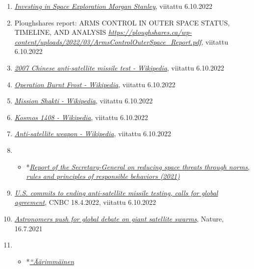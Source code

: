 \begin{enumerate}
\item
  \href{https://www.morganstanley.com/ideas/investing-in-space}{\emph{Investing
  in Space Exploration \textbar{} Morgan Stanley}}, viitattu 6.10.2022
\item
  Ploughshares report: ARMS CONTROL IN OUTER SPACE STATUS, TIMELINE, AND
  ANALYSIS\emph{
  }\href{https://ploughshares.ca/wp-content/uploads/2022/03/ArmsControlOuterSpace_Report.pdf}{\emph{https://ploughshares.ca/wp-content/uploads/2022/03/ArmsControlOuterSpace\_Report.pdf}},
  viitattu 6.10.2022
\item
  \href{https://en.wikipedia.org/wiki/2007_Chinese_anti-satellite_missile_test}{\emph{2007
  Chinese anti-satellite missile test - Wikipedia}}, viitattu 6.10.2022
\item
  \href{https://en.wikipedia.org/wiki/Operation_Burnt_Frost}{\emph{Operation
  Burnt Frost - Wikipedia}}, viitattu 6.10.2022
\item
  \href{https://en.wikipedia.org/wiki/Mission_Shakti}{\emph{Mission
  Shakti - Wikipedia}}, viitattu 6.10.2022
\item
  \href{https://en.wikipedia.org/wiki/Kosmos_1408}{\emph{Kosmos 1408 -
  Wikipedia}}, viitattu 6.10.2022
\item
  \href{https://en.wikipedia.org/wiki/Anti-satellite_weapon}{\emph{Anti-satellite
  weapon - Wikipedia}}, viitattu 6.10.2022
\item
  \begin{itemize}
  \tightlist
  \item
    *\href{https://www.un.org/disarmament/topics/outerspace-sg-report-outer-space-2021/}{\emph{Report
    of the Secretary-General on reducing space threats through norms,
    rules and principles of responsible behaviors (2021)}}
  \end{itemize}
\item
  \href{https://www.cnbc.com/2022/04/18/us-to-end-anti-satellite-asat-testing-calls-for-global-agreement.html}{\emph{U.S.
  commits to ending anti-satellite missile testing, calls for global
  agreement}}, CNBC 18.4.2022, viitattu 6.10.2022
\item
  \href{https://www.nature.com/articles/d41586-021-01954-4}{\emph{Astronomers
  push for global debate on giant satellite swarms}}, Nature, 16.7.2021
\item
  \begin{itemize}
  \tightlist
  \item
    *\href{https://www.mustread.fi/artikkelit/aarimmainen-avaruusmyrsky-voi-iskea-lahitulevaisuudessa-silti-paattajat-eivat-ole-varautuneet-globaaliin-uhkaan/}{\emph{``Äärimmäinen
}}
\end{itemize}
\end{enumerate}
